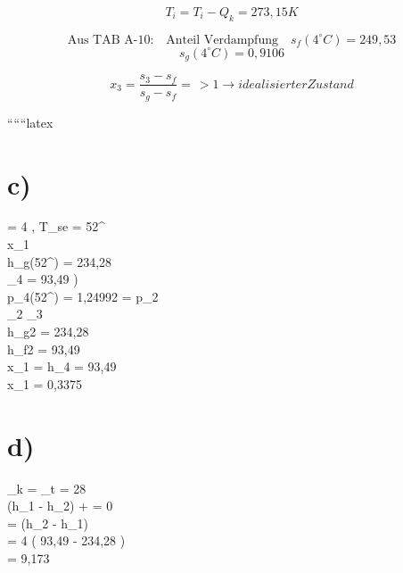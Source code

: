 \[
T_i = T_i - Q_k = 273,15 K
\]

\[
\text{Aus TAB A-10:} \quad \text{Anteil Verdampfung} \quad s_f (4^\circ C) = 249,53
\]
\[
s_g (4^\circ C) = 0,9106
\]

\[
x_3 = \frac{s_3 - s_f}{s_g - s_f} = \frac{}{} > 1 \rightarrow idealisierter Zustand
\]

``````latex


\section*{c)}
 \quad {} = 4 , \quad T_{se} = 52^\circ {} \\
 \quad x_1 \\

 \quad h_{g}(52^\circ {}) = 234,28  \\
_4 = 93,49 ) \\
 \quad p_{4}(52^\circ {}) = 1,24992  = p_2 \\

_2 _3  \\
h_{g2} = 234,28  \\
h_{f2} = 93,49  \\

x_1 =  \quad {} \quad h_4 = 93,49 \\

\Rightarrow x_1 = 0,3375 \\

\section*{d)}
 \quad {}_k =  \quad {} \quad {}_t = 28 \,  \\

   \quad {} (h_1 - h_2) +  = 0 \\
 =  (h_2 - h_1) \\
\Rightarrow {} = 4  \cdot {} \left( 93,49 - 234,28 \right) \\
\Rightarrow {} = 9,173 \,  \\


